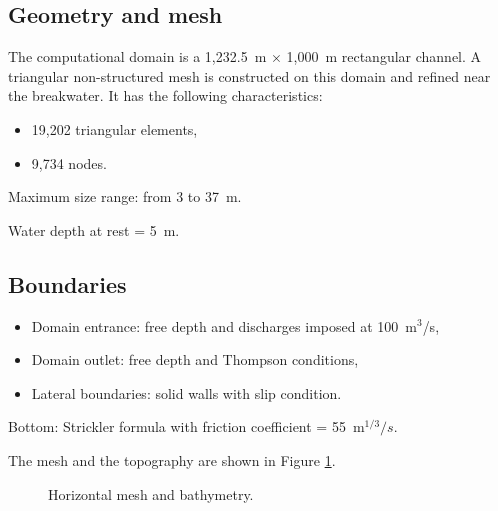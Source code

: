 \subsection{Geometry and mesh}

The computational domain is a 1,232.5~m $\times$ 1,000~m rectangular channel.
A triangular non-structured mesh is constructed on this domain
and refined near the breakwater.
It has the following characteristics:
\begin{itemize}
\item 19,202 triangular elements,
\item 9,734 nodes.
\end{itemize}
Maximum size range: from 3 to 37~m.

Water depth at rest = 5~m.

\subsection{Boundaries}

\begin{itemize}
\item Domain entrance: free depth and discharges imposed at 100~m$^3$/s,
\item Domain outlet: free depth and Thompson conditions,
\item Lateral boundaries: solid walls with slip condition.
\end{itemize}

Bottom: Strickler formula with friction coefficient = 55~m$^{1/3}/s$.

The mesh and the topography are shown in Figure \ref{fig:digue:MeshBathy}.

\begin{figure}[H]
\begin{minipage}[t]{0.5\textwidth}
 \centering
\end{minipage}
\begin{minipage}[t]{0.5\textwidth}
 \centering
\end{minipage}
\caption{Horizontal mesh and bathymetry.}
\label{fig:digue:MeshBathy}
\end{figure}


